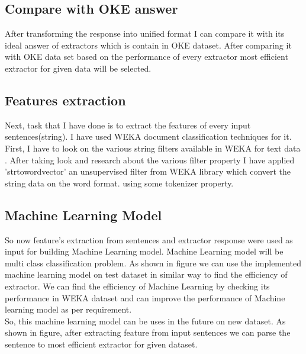 \documentclass{llncs}
\begin{document}
\subsection{Compare with OKE answer}
After transforming the response into unified format I can compare it with its ideal answer of extractors which is contain in OKE dataset. After comparing it with OKE data set based on the performance of every extractor most efficient extractor for given data will be selected.
\subsection{Features extraction}
Next, task that I have done is to extract the features of every input sentences(string). I have used WEKA document classification techniques for it. First, I have to look on the various string filters available in WEKA for text data . After taking look and research about the  various filter property I have applied 'strtowordvector' an unsupervised filter from WEKA library which convert the string data on the word format. using some tokenizer property.
\subsection{Machine Learning Model}
So now feature’s extraction from sentences and extractor response were used as input for building Machine Learning model.  Machine Learning model will be multi class classification problem.  As shown in figure we can use the implemented machine learning model on test dataset in similar way to find the efficiency of extractor. We can find the efficiency of Machine Learning by checking its performance in WEKA dataset and can improve the performance of Machine learning model as per requirement.\\
So, this machine learning model can be uses in the future on new dataset. As shown in figure, after extracting feature from input sentences we can parse the sentence to most efficient extractor for given dataset.






 
\end{document}
